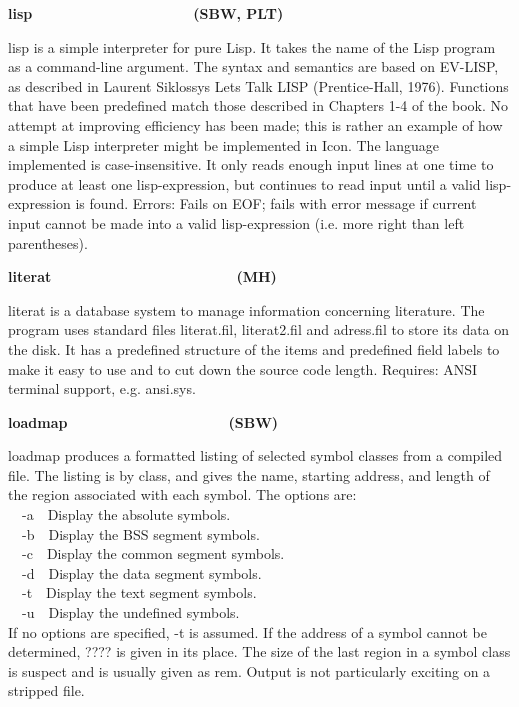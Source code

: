 {\sffamily\bfseries
lisp\ \ \ \ \ \ \ \ \ \ \ \ \ \ \ \ \ \ \ \  (SBW, PLT)}

\textsf{lisp} is a simple interpreter for pure Lisp. It
takes the name of the Lisp program as a command-line argument. The
syntax and semantics are based on EV-LISP, as described in Laurent
Siklossy{\textquotesingle}s {\textquotedbl}Let{\textquotesingle}s Talk
LISP{\textquotedbl} (Prentice-Hall, 1976). Functions that have been
predefined match those described in Chapters 1-4 of the book. No
attempt at improving efficiency has been made; this is rather an
example of how a simple Lisp interpreter might be implemented in Icon.
The language implemented is case-insensitive. It only reads enough
input lines at one time to produce at least one lisp-expression, but
continues to read input until a valid lisp-expression is found. Errors:
Fails on EOF; fails with error message if current input cannot be made
into a valid lisp-expression (i.e. more right than left parentheses). 

{\sffamily\bfseries
literat\ \ \ \ \ \ \ \ \ \ \ \ \ \ \ \ \ \ \ \ \ \  \ (MH)}

\textsf{literat} is a database system to manage
information concerning literature. The program uses
standard files \textsf{literat.fil}, \textsf{literat2.fil} and
\textsf{adress.fil} to store its data on the disk. It has a predefined
structure of the items and predefined field labels to make it easy to
use and to cut down the source code length. Requires: ANSI terminal
support, e.g. \textsf{ansi.sys}.

{\sffamily\bfseries
loadmap\ \ \ \ \ \ \ \ \ \ \ \ \ \ \ \ \ \ \ \ (SBW)}

\textsf{loadmap} produces a formatted listing of selected symbol classes
from a compiled file. The listing is by class, and gives the name,
starting address, and length of the region associated with each symbol.
The options are:\\
\ \ \textsf{{}-a}\ \ Display the absolute symbols.\\
\ \ \textsf{{}-b}\ \ Display the BSS segment symbols.\\
\ \ \textsf{{}-c}\ \ Display the common segment symbols.\\
\ \ \textsf{{}-d}\ \ Display the data segment symbols.\\
\ \ \textsf{{}-t}\ \ Display the text segment symbols.\\
\ \ \textsf{{}-u}\ \ Display the undefined symbols.\\
If no options are specified, \textsf{{}-t} is assumed. If the address of
a symbol cannot be determined, ???? is given in its place. The size of
the last region in a symbol class is suspect and is usually given as
rem. Output is not particularly exciting on a stripped file.

